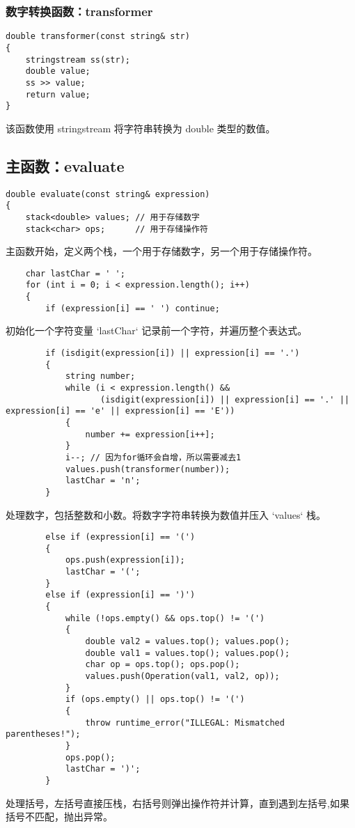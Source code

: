 \documentclass[UTF8]{ctexart}
\begin{document}
\subsubsection{数字转换函数：transformer}
\begin{verbatim}
double transformer(const string& str) 
{
    stringstream ss(str);
    double value;
    ss >> value;
    return value;
}
\end{verbatim}
该函数使用 stringstream 将字符串转换为 double 类型的数值。

\subsection{主函数：evaluate}
\begin{verbatim}
double evaluate(const string& expression) 
{
    stack<double> values; // 用于存储数字
    stack<char> ops;      // 用于存储操作符
\end{verbatim}
主函数开始，定义两个栈，一个用于存储数字，另一个用于存储操作符。

\begin{verbatim}
    char lastChar = ' ';
    for (int i = 0; i < expression.length(); i++) 
    {
        if (expression[i] == ' ') continue;
\end{verbatim}
初始化一个字符变量 `lastChar` 记录前一个字符，并遍历整个表达式。

\begin{verbatim}
        if (isdigit(expression[i]) || expression[i] == '.') 
        {
            string number;
            while (i < expression.length() &&
                   (isdigit(expression[i]) || expression[i] == '.' || expression[i] == 'e' || expression[i] == 'E')) 
            {
                number += expression[i++];
            }
            i--; // 因为for循环会自增，所以需要减去1
            values.push(transformer(number));
            lastChar = 'n';
        }
\end{verbatim}
处理数字，包括整数和小数。将数字字符串转换为数值并压入 `values` 栈。

\begin{verbatim}
        else if (expression[i] == '(') 
        {
            ops.push(expression[i]);
            lastChar = '(';
        }
        else if (expression[i] == ')') 
        {
            while (!ops.empty() && ops.top() != '(') 
            {
                double val2 = values.top(); values.pop();
                double val1 = values.top(); values.pop();
                char op = ops.top(); ops.pop();
                values.push(Operation(val1, val2, op));
            }
            if (ops.empty() || ops.top() != '(') 
            {
                throw runtime_error("ILLEGAL: Mismatched parentheses!");
            }
            ops.pop();
            lastChar = ')';
        }
\end{verbatim}
处理括号，左括号直接压栈，右括号则弹出操作符并计算，直到遇到左括号,如果括号不匹配，抛出异常。
\end{document}
